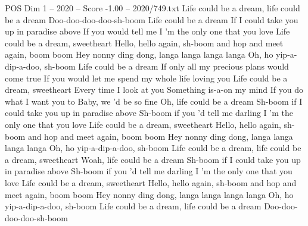 \begin{textsample}{POS Dim 1 – 2020 – Score -1.00 – 2020/749.txt}  \label{ex:f1_pos_020}
Life could be a dream, life could be a dream Doo-doo-doo-doo-sh-boom Life could be a dream If I could take you up in paradise above If you would tell me I 'm the only one that you love Life could be a dream, sweetheart Hello, hello again, sh-boom and hop and meet again, boom boom Hey nonny ding dong, langa langa langa langa Oh, ho yip-a-dip-a-doo, sh-boom Life could be a dream If only all my precious plans would come true If you would let me spend my whole life loving you Life could be a dream, sweetheart Every time I look at you Something is-a-on my mind If you do what I want you to Baby, we 'd be so fine Oh, life could be a dream Sh-boom if I could take you up in paradise above Sh-boom if you 'd tell me darling I 'm the only one that you love Life could be a dream, sweetheart Hello, hello again, sh-boom and hop and meet again, boom boom Hey nonny ding dong, langa langa langa langa Oh, ho yip-a-dip-a-doo, sh-boom Life could be a dream, life could be a dream, sweetheart Woah, life could be a dream Sh-boom if I could take you up in paradise above Sh-boom if you 'd tell me darling I 'm the only one that you love Life could be a dream, sweetheart Hello, hello again, sh-boom and hop and meet again, boom boom Hey nonny ding dong, langa langa langa langa Oh, ho yip-a-dip-a-doo, sh-boom Life could be a dream, life could be a dream Doo-doo-doo-doo-sh-boom

\end{textsample}
